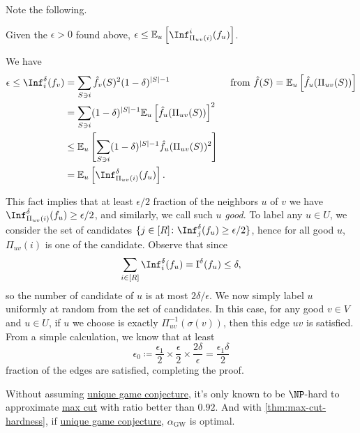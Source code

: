 Note the following.
\begin{remark}[Fact]
	Given the \(\epsilon > 0\) found above, \(\epsilon \leq \mathbb{E}_{u}\left[\Inf_{\Pi _{uv}(i)}^i (f_u) \right]\).
\end{remark}
\begin{explanation}
	We have
	\[
		\begin{aligned}
			\epsilon
			\leq \Inf_i^\delta (f_v)
			 & = \sum_{S \ni i} \hat{f} _v(S)^2(1-\delta )^{\vert S \vert - 1}                                            & \text{ from } \hat{f} (S) = \mathbb{E}_{u}\left[\hat{f} _u(\Pi _{uv}(S)) \right] \\
			 & = \sum_{S \ni i} (1-\delta )^{\vert S \vert - 1}\mathbb{E}_{u}\left[\hat{f} _u(\Pi _{uv}(S)) \right] ^2                                                                                       \\
			 & \leq \mathbb{E}_{u}\left[\sum_{S \ni i} (1-\delta )^{\vert S \vert - 1} \hat{f} _u(\Pi _{uv}(S))^2 \right]                                                                                    \\
			 & = \mathbb{E}_{u}\left[\Inf_{\Pi _{uv}(i)}^\delta (f_u) \right].
		\end{aligned}
	\]
\end{explanation}

This fact implies that at least \(\epsilon / 2\) fraction of the neighbors \(u\) of \(v\) we have \(\Inf_{\Pi _{uv}(i)}^\delta  (f_u) \geq \epsilon / 2\), and similarly, we call such \(u\) \emph{good}. To label any \(u\in U\), we consider the set of candidates \(\{ j\in [R]\colon \Inf_{j}^\delta (f_u) \geq \epsilon /2 \} \), hence for all good \(u\), \(\Pi _{uv}(i)\) is one of the candidate. Observe that since
\[
	\sum_{i\in [R]} \Inf_{i}^\delta (f_u) = \operatorname{I}^{\delta }(f_u) \leq \delta,
\]
so the number of candidate of \(u\) is at most \(2\delta / \epsilon \). We now simply label \(u\) uniformly at random from the set of candidates. In this case, for any good \(v\in V\) and \(u\in U\), if \(u\) we choose is exactly \(\Pi_{uv}^{-1} (\sigma (v)) \), then this edge \(uv\) is satisfied. From a simple calculation, we know that at least
\[
	\epsilon _0 \coloneqq \frac{\epsilon _1}{2}\times \frac{\epsilon }{2} \times \frac{2\delta }{\epsilon } = \frac{\epsilon _1 \delta }{2}
\]
fraction of the edges are satisfied, completing the proof.

\begin{remark}
	Without assuming \hyperref[conj:unique-game]{unique game conjecture}, it's only known to be \(\NP\)-hard to approximate \hyperref[prb:max-cut]{max cut} with ratio better than \(0.92\). And with \autoref{thm:max-cut-hardness}, if \hyperref[conj:unique-game]{unique game conjecture}, \(\alpha _{\mathrm{GW} }\) is optimal.
\end{remark}